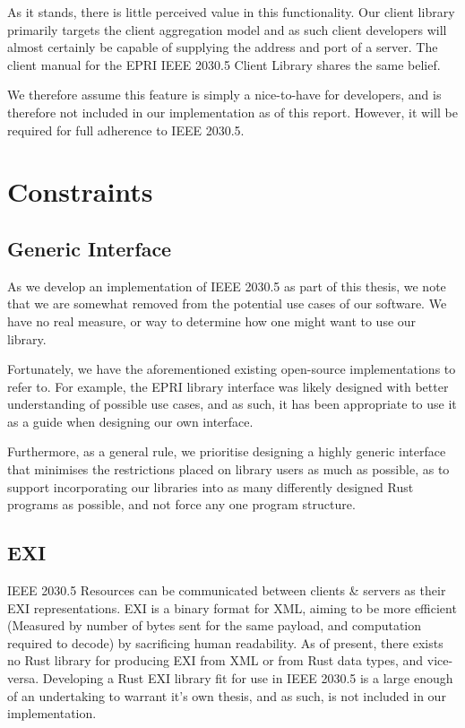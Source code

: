 As it stands, there is little perceived value in this functionality. Our client library primarily targets the client aggregation model and as such client developers will almost certainly be capable of supplying the address and port of a server.
The client manual for the EPRI IEEE 2030.5 Client Library shares the same belief. \cite{eprimanual}

We therefore assume this feature is simply a nice-to-have for developers, and is therefore not included in our implementation as of this report. However, it will be required for full adherence to IEEE 2030.5.

\section{Constraints}

\subsection{Generic Interface}
As we develop an implementation of IEEE 2030.5 as part of this thesis, we note that we are somewhat removed from the potential use cases of our software. We have no real measure, or way to determine how one might want to use our library. 

Fortunately, we have the aforementioned existing open-source implementations to refer to. For example, the EPRI library interface was likely designed with better understanding of possible use cases, and as such, it has been appropriate to use it as a guide when designing our own interface.

Furthermore, as a general rule, we prioritise designing a highly generic interface that minimises the restrictions placed on library users as much as possible, as to support incorporating our libraries into as many differently designed Rust programs as possible, and not force any one program structure.

\subsection{EXI}
IEEE 2030.5 Resources can be communicated between clients \& servers as their EXI representations. EXI is a binary format for XML, aiming to be more efficient (Measured by number of bytes sent for the same payload, and computation required to decode) by sacrificing human readability. As of present, there exists no Rust library for producing EXI from XML or from Rust data types, and vice-versa.
Developing a Rust EXI library fit for use in IEEE 2030.5 is a large enough of an undertaking to warrant it's own thesis, and as such, is not included in our implementation.